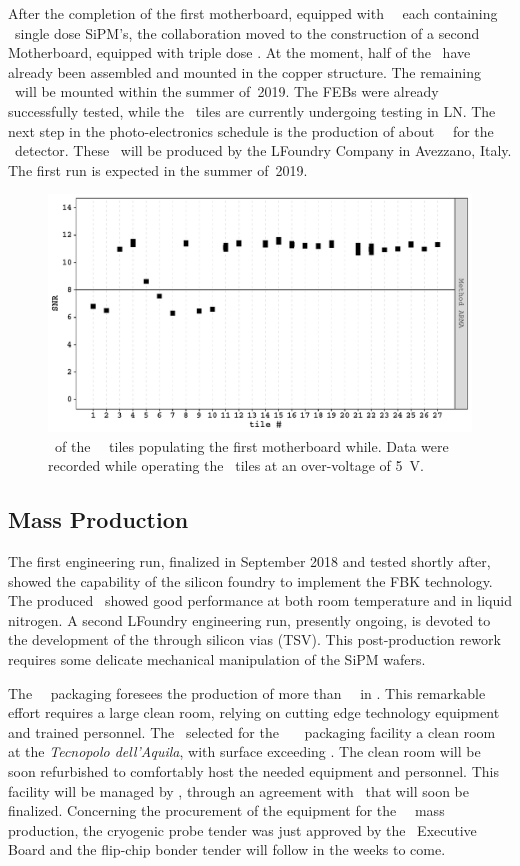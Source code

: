 After the completion of the first motherboard, equipped with \DSkSQBPdmsNumber\ \DSkPdms\ each containing  \DSkTileSiPMsCustomNumber\ single dose SiPM's, the collaboration moved to the construction of a second Motherboard, equipped with triple dose \SiPMs.   At the moment, half of the \DSkPdms\ have already been assembled and mounted in the copper structure. The remaining \DSkPdms\ will be mounted within the summer of~2019.  The FEBs were already successfully tested, while the \SiPM\ tiles are currently undergoing testing in LN. The next step in the photo-electronics schedule is the production of about  \DSkPdmsSecondBatchNumber\ \DSkPdms\ for the \DSps\ detector. These \SiPMs\ will be produced by the LFoundry Company in Avezzano, Italy.  The first run is expected in the summer of~2019. 

\begin{figure}[t!]
\includegraphics[width=0.5\columnwidth]{./Figures/SNR2.PDF}
\caption[\SNR\ of the \SiPMs\ tiles of the first motherboard]{\SNR\ of the \DSkSQBPdmsNumber\ \SiPM\ tiles populating the first motherboard while.  Data were recorded while operating the \SiPM\ tiles at an over-voltage of \SI{5}{\volt}.}
\label{fig:SNR2} 
\end{figure} 


\subsection{Mass Production}

The first engineering run, finalized in September 2018 and tested shortly after, showed the capability of the silicon foundry to implement the FBK technology.  The produced \SiPMs\ showed good performance at both room temperature and in liquid nitrogen. A second LFoundry engineering run, presently ongoing, is devoted to the development of the through silicon vias (TSV). This post-production rework requires some delicate mechanical manipulation of the SiPM wafers.

The \DSks\ \SiPM\ packaging foresees the production of more than \DSkPdmsNumberWithSpares\ \DSkPdms\ in \DSkPdmsContructionTime. This remarkable effort requires a large clean room, relying on cutting edge technology equipment and trained personnel.  The \GADMC\ selected for the \NOA\ \DSks\ \SiPM\ packaging facility a clean room at the {\it Tecnopolo dell'Aquila}, with surface exceeding \DSkPdmsCleanRoomSurface.  The clean room will be soon refurbished to comfortably host the needed equipment and personnel.  This facility will be managed by \GSSI, through an agreement with \INFN\ that will soon be finalized.  Concerning the procurement of the equipment for the \DSks\ \DSkPdms\ mass production, the cryogenic probe tender was just approved by the \INFN\ Executive Board and the flip-chip bonder tender will follow in the weeks to come.